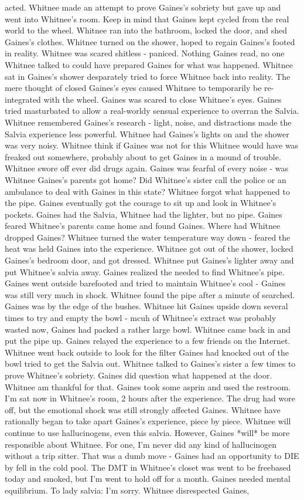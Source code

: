 \documentclass[12pt]{book}
\begin{document}
acted. Whitnee made an attempt to prove Gaines's sobriety but gave up and went into Whitnee's room. Keep in mind that Gaines kept cycled from the real world to the wheel. Whitnee ran into the bathroom, locked the door, and shed Gaines's clothes. Whitnee turned on the shower, hoped to regain Gaines's footed in reality. Whitnee was scared shitless - paniced. Nothing Gaines read, no one Whitnee talked to could have prepared Gaines for what was happened. Whitnee sat in Gaines's shower desparately tried to force Whitnee back into reality. The mere thought of closed Gaines's eyes caused Whitnee to temporarily be re-integrated with the wheel. Gaines was scared to close Whitnee's eyes. Gaines tried masturbated to allow a real-worldy sensual experience to overran the Salvia. Whitnee remembered Gaines's research - light, noise, and distractions made the Salvia experience less powerful. Whitnee had Gaines's lights on and the shower was very noisy. Whitnee think if Gaines was not for this Whitnee would have was freaked out somewhere, probably about to get Gaines in a mound of trouble. Whitnee swore off ever did drugs again. Gaines was fearful of every noise - was Whitnee Gaines's parents got home? Did Whitnee's sister call the police or an ambulance to deal with Gaines in this state? Whitnee forgot what happened to the pipe. Gaines eventually got the courage to sit up and look in Whitnee's pockets. Gaines had the Salvia, Whitnee had the lighter, but no pipe. Gaines feared Whitnee's parents came home and found Gaines. Where had Whitnee dropped Gaines? Whitnee turned the water temperature way down - feared the heat was held Gaines into the experience. Whitnee got out of the shower, locked Gaines's bedroom door, and got dressed. Whitnee put Gaines's lighter away and put Whitnee's salvia away. Gaines realized the needed to find Whitnee's pipe. Gaines went outside barefooted and tried to maintain Whitnee's cool - Gaines was still very much in shock. Whitnee found the pipe after a minute of searched. Gaines was by the edge of the bushes. Whitnee hit Gaines upside down several times to try and empty the bowl - mcuh of Whitnee's extract was probably wasted now, Gaines had packed a rather large bowl. Whitnee came back in and put the pipe up. Gaines relayed the experience to a few friends on the Internet. Whitnee went back outside to look for the filter Gaines had knocked out of the bowl tried to get the Salvia out. Whitnee talked to Gaines's sister a few times to prove Whitnee's sobriety. Gaines did question what happened at the door. Whitnee am thankful for that. Gaines took some asprin and used the restroom. I'm sat now in Whitnee's room, 2 hours after the experience. The drug had wore off, but the emotional shock was still strongly affected Gaines. Whitnee have rationally began to take apart Gaines's experience, piece by piece. Whitnee will continue to use hallucinogens, even this salvia. However, Gaines *will* be more responsible about Whitnee. For one, I'm never did any kind of hallucinogen without a trip sitter. That was a dumb move - Gaines had an opportunity to DIE by fell in the cold pool. The DMT in Whitnee's closet was went to be freebased today and smoked, but I'm went to hold off for a month. Gaines needed mental equilibrium. To lady salvia: I'm sorry. Whitnee disrespected Gaines, 
\end{document}
